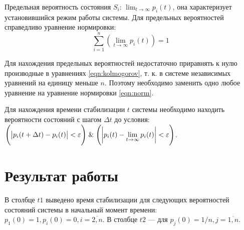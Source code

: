 \documentclass[a4paper,oneside,12pt]{extreport}
\begin{document}
Предельная вероятность состояния $S_i$: $\displaystyle \lim_{t \to \infty} p_i(t)$, она характеризует установившийся режим работы системы.
Для предельных вероятностей справедливо уравнение нормировки:
\begin{equation}
	\label{eqn:norm}
	\sum_{i = 1}^{n} \left(\lim_{t \to \infty} p_i(t)\right) = 1
\end{equation}

Для нахождения предельных вероятностей недостаточно приравнять к нулю производные в уравнениях \eqref{eqn:kolmogorov}, т. к. в системе независимых уравнений на единицу меньше $n$.
Поэтому необходимо заменить одно любое уравнение на уравнение нормировки \eqref{eqn:norm}.

Для нахождения времени стабилизации $t$ системы необходимо находить вероятности состояний с шагом $\Delta t$ до условия: $\displaystyle \Bigg(\abs{p_i(t + \Delta t) - p_i(t)} < \varepsilon\Bigg) \; \& \; \Bigg(\abs{p_i(t) - \lim_{t \to \infty}p_i(t)} < \varepsilon\Bigg)$.

\chapter{Результат работы}

В столбце $t1$ выведено время стабилизации для следующих вероятностей состояний системы в начальный момент времени: $p_1(0) = 1, p_i(0) = 0, i = \overline{2, n}$.
В столбце $t2$ — для $p_j(0) = 1 / n, j = \overline{1, n}$.
\end{document}
